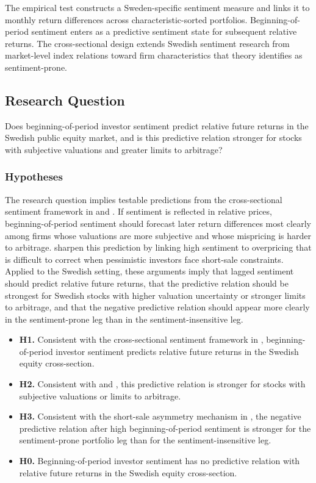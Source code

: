 \documentclass[11pt]{article}
\begin{document}
The empirical test constructs a Sweden-specific sentiment measure and links it to monthly return differences across characteristic-sorted portfolios. Beginning-of-period sentiment enters as a predictive sentiment state for subsequent relative returns. The cross-sectional design extends Swedish sentiment research from market-level index relations toward firm characteristics that theory identifies as sentiment-prone.

\subsection{Research Question}
\begin{displayquote}
Does beginning-of-period investor sentiment predict relative future returns in the Swedish public equity market, and is this predictive relation stronger for stocks with subjective valuations and greater limits to arbitrage?
\end{displayquote}

\subsubsection{Hypotheses}
The research question implies testable predictions from the cross-sectional sentiment framework in \citet{baker2006sentiment} and \citet{baker2007}. If sentiment is reflected in relative prices, beginning-of-period sentiment should forecast later return differences most clearly among firms whose valuations are more subjective and whose mispricing is harder to arbitrage. \citet{stambaugh2012short} sharpen this prediction by linking high sentiment to overpricing that is difficult to correct when pessimistic investors face short-sale constraints. Applied to the Swedish setting, these arguments imply that lagged sentiment should predict relative future returns, that the predictive relation should be strongest for Swedish stocks with higher valuation uncertainty or stronger limits to arbitrage, and that the negative predictive relation should appear more clearly in the sentiment-prone leg than in the sentiment-insensitive leg.

\begin{itemize}
    \item \textbf{H1.} Consistent with the cross-sectional sentiment framework in \citet{baker2006sentiment}, beginning-of-period investor sentiment predicts relative future returns in the Swedish equity cross-section.
    \item \textbf{H2.} Consistent with \citet{baker2006sentiment} and \citet{baker2007}, this predictive relation is stronger for stocks with subjective valuations or limits to arbitrage.
    \item \textbf{H3.} Consistent with the short-sale asymmetry mechanism in \citet{stambaugh2012short}, the negative predictive relation after high beginning-of-period sentiment is stronger for the sentiment-prone portfolio leg than for the sentiment-insensitive leg.
    \item \textbf{H0.} Beginning-of-period investor sentiment has no predictive relation with relative future returns in the Swedish equity cross-section.
\end{itemize}
\end{document}
